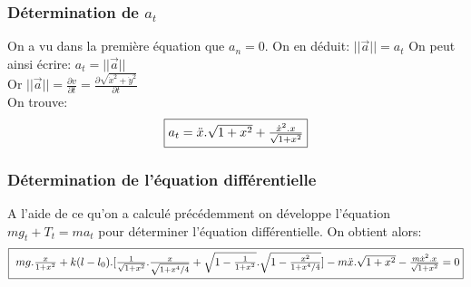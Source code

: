 \documentclass[10pt,a4paper]{article}
\begin{document}
\subsubsection{Détermination de $a_t$}
On a vu dans la première équation que $a_n=0$. On en déduit: $||\vec{a}||=a_t$
On peut ainsi écrire: $a_t=||\vec{a}||$\\ %
Or $||\vec{a}||=\frac{\partial v}{\partial t}=\frac{\partial \sqrt{\dot{x}^2+\dot{y}^2}}{\partial t}$\\
On trouve: \[\fbox{$a_t=\ddot{x}.\sqrt{1+x^2}+ \frac{\dot{x}^2.x}{\sqrt{1+x^2}}$}\] %

\subsubsection{Détermination de l'équation différentielle}
A l'aide de ce qu'on a calculé précédemment on développe l'équation $mg_t+T_t=ma_t$ pour déterminer l'équation différentielle.
On obtient alors: 
\[\fbox{ $mg.\frac{x}{1+x^2} + k(l-l_0).[\frac{1}{\sqrt{1+x^2}}.\frac{x}{\sqrt{1+x^4/4}} + \sqrt{1-\frac{1}{1+x^2}}.\sqrt{1-\frac{x^2}{1+x^4/4}}] - m\ddot{x}.\sqrt{1+x^2} - \frac{m\dot{x}^2.x}{\sqrt{1+x^2}} = 0$}\]

\end{document}
